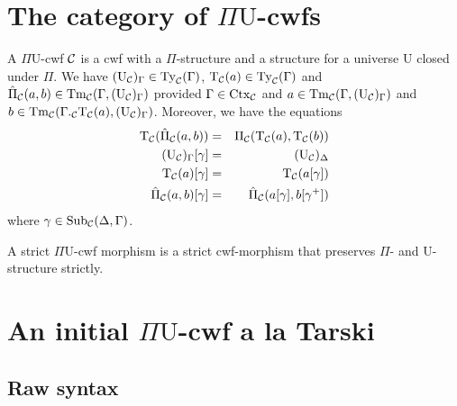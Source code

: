 \documentclass{lmcs}
\def\UU{\mathrm{U}}
\def\Ta{\mathrm{T}}
\def\Pihat{\hat{\Pi}}
\begin{document}
\section{The category of $\Pi\UU$-cwfs}

 A $\Pi \UU$-cwf ${\mathcal C}$ is a cwf with a $\Pi$-structure and a structure for a universe $\UU$ closed under $\Pi$. We have $(\UU_\C)_\Gamma \in \Ty_\C(\Gamma)$, $\Ta_\C(a) \in \Ty_\C(\Gamma)$ and $\Pihat_\C(a,b) \in \Tm_\C(\Gamma,(\UU_\C)_\Gamma)$ provided $\Gamma \in \mathrm{Ctx}_{\mathcal C}$ and $a  \in \Tm_\C(\Gamma,(\UU_\C)_\Gamma)$ and 
$b \in \Tm_\C(\Gamma ._\C \Ta_\C(a),(\UU_\C)_\Gamma)$. Moreover, we have the equations
\begin{eqnarray*}
\Ta_\C(\Pihat_\C(a,b)) &= &\Pi_\C(\Ta_\C(a),\Ta_\C(b))\\
(\UU_\C)_\Gamma[\gamma] &=&( \UU_\C)_\Delta\\
\Ta_\C(a)[\gamma] &=& \Ta_\C(a[\gamma])\\
\Pihat_\C(a,b)[\gamma] &=& \Pihat_\C(a[\gamma],b[\gamma^+])
\end{eqnarray*}
where $\gamma \in \mathrm{Sub}_{\mathcal C}(\Delta,\Gamma)$.

A strict $\Pi\UU$-cwf morphism is a strict cwf-morphism that preserves $\Pi$- and $\UU$-structure strictly.

\section{An initial $\Pi\UU$-cwf a la Tarski}
\label{sec:syntax}

\subsection{Raw syntax}\label{sec:grammar}
\end{document}
